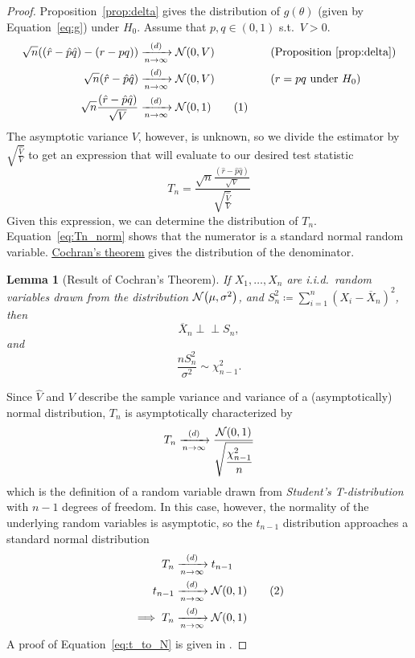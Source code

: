 \documentclass[letterpaper, reqno]{amsart}
\newtheorem{lemma}[theorem]{Lemma}
\numberwithin{equation}{section}
\newcommand{\numberthis}{\addtocounter{equation}{1}\tag{\theequation}}
\newcommand{\ddfrac}[2]{\frac{\displaystyle #1}{\displaystyle #2}}
\newcommand{\N}[2]{\mathcal{N}\mleft( #1, #2 \mright)}
\newcommand{\indep}{\perp \!\!\! \perp}  %
\newcommand{\iid}{i.i.d.}
\newcommand{\sumi}[2]{\sum_{#1=1}^{#2}}
\newcommand{\by}[1]{&\quad&\text{(#1)}}
\newcommand{\Dlim}{\xrightarrow[n \to \infty]{(d)}}
\newcommand{\phat}{\hat{p}}
\newcommand{\qhat}{\hat{q}}
\newcommand{\rhat}{\hat{r}}
\newcommand{\Xnbar}{\overline{X}_n}
\begin{document}
\begin{proof}
Proposition~\ref{prop:delta} gives the distribution of $g(\theta)$ (given by
Equation~\eqref{eq:g}) under $H_0$.
Assume that $p, q \in (0, 1)$ s.t.\ $V > 0$.
\begin{alignat*}{3}
  \sqrt{n}\mleft((\rhat - \phat\qhat) - (r - pq)\mright) &\Dlim \N{0}{V}
  \by{Proposition~\ref{prop:delta}} \\
  \sqrt{n}(\rhat - \phat\qhat) &\Dlim \N{0}{V} \by{$r = pq$ under $H_0$} \\
  \sqrt{n}\frac{(\rhat - \phat\qhat)}{\sqrt{V}} &\Dlim \N{0}{1} \numberthis \label{eq:Tn_norm}
\end{alignat*}
The asymptotic variance $V$, however, is unknown, so we divide the estimator by
$\sqrt{\frac{\hat{V}}{V}}$ to get an expression that will evaluate to our
desired test statistic
\begin{equation} \label{eq:t1}
  T_n = \ddfrac{\sqrt{n}\frac{(\rhat - \phat\qhat)}{\sqrt{V}}}
               {\sqrt{\frac{\hat{V}}{V}}}
\end{equation}
Given this expression, we can determine the distribution of $T_n$.
Equation~\eqref{eq:Tn_norm} shows that the numerator is a standard normal random
variable.
\href{https://en.wikipedia.org/wiki/Cochran's_theorem}{\underline{Cochran's theorem}}
gives the distribution of the denominator.
\begin{lemma}[Result of Cochran's Theorem]
  If $X_1, \dots, X_n$ are \iid\ random variables drawn from the distribution
  $\N{\mu}{\sigma^2}$, and $S_n^2 \coloneqq \sumi{i}{n} (X_i - \Xnbar)^2$,
  then
  \[ \Xnbar \indep S_n, \]
  and
  \[ \frac{n S_n^2}{\sigma^2} \sim \chi^2_{n-1}. \]
\end{lemma}
Since $\hat{V}$ and $V$ describe the sample variance and variance of a
(asymptotically) normal distribution, $T_n$ is asymptotically characterized by
\begin{equation}
  T_n \Dlim \ddfrac{\N{0}{1}}{\sqrt{\frac{\chi^2_{n-1}}{n}}}
\end{equation}
which is the definition of a random variable drawn from \emph{Student's
T-distribution} with $n-1$ degrees of freedom. In this case, however, the
normality of the underlying random variables is asymptotic, so the $t_{n-1}$
distribution approaches a standard normal distribution
\begin{align*}
  T_n &\Dlim t_{n-1} \\
  t_{n-1} &\Dlim \N{0}{1} \numberthis \label{eq:t_to_N} \\
  \implies T_n &\Dlim \N{0}{1} \qedhere
\end{align*}
A proof of Equation~\eqref{eq:t_to_N} is given in .
\end{proof}
\end{document}
